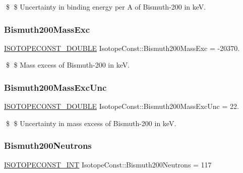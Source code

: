 \$ \$ Uncertainty in binding energy per A of Bismuth-\/200 in keV. \mbox{\label{group___isotope_const-_bismuth-_bi200_ga6dbb37f0f8842ba6bbe87385c4627d89}} 
\subsubsection{\texorpdfstring{Bismuth200\+Mass\+Exc}{Bismuth200MassExc}}
{\footnotesize\ttfamily \mbox{\hyperlink{group___isotope_const-_macros_ga8f45a7272ce02c0b4c65c44636ed719a}{I\+S\+O\+T\+O\+P\+E\+C\+O\+N\+S\+T\+\_\+\+D\+O\+U\+B\+LE}} Isotope\+Const\+::\+Bismuth200\+Mass\+Exc = -\/20370.}

\$ \$ Mass excess of Bismuth-\/200 in keV. \mbox{\label{group___isotope_const-_bismuth-_bi200_ga58df9d36f4e3edc5234d128e56e590c0}} 
\subsubsection{\texorpdfstring{Bismuth200\+Mass\+Exc\+Unc}{Bismuth200MassExcUnc}}
{\footnotesize\ttfamily \mbox{\hyperlink{group___isotope_const-_macros_ga8f45a7272ce02c0b4c65c44636ed719a}{I\+S\+O\+T\+O\+P\+E\+C\+O\+N\+S\+T\+\_\+\+D\+O\+U\+B\+LE}} Isotope\+Const\+::\+Bismuth200\+Mass\+Exc\+Unc = 22.}

\$ \$ Uncertainty in mass excess of Bismuth-\/200 in keV. \mbox{\label{group___isotope_const-_bismuth-_bi200_gae8e66937f2295cf0d06ecc818ecbe0a1}} 
\subsubsection{\texorpdfstring{Bismuth200\+Neutrons}{Bismuth200Neutrons}}
{\footnotesize\ttfamily \mbox{\hyperlink{group___isotope_const-_macros_ga5f18360b3e99483a35c32d789e62621c}{I\+S\+O\+T\+O\+P\+E\+C\+O\+N\+S\+T\+\_\+\+I\+NT}} Isotope\+Const\+::\+Bismuth200\+Neutrons = 117}

